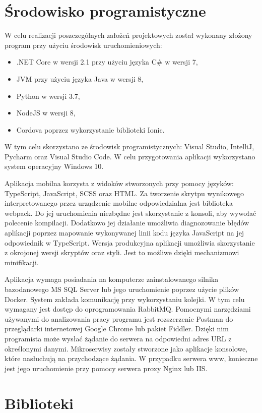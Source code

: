 \section{Środowisko programistyczne}
W celu realizacji poszczególnych założeń projektowych został wykonany złożony program przy użyciu środowisk uruchomieniowych: 
\begin{itemize}[noitemsep]
	\item .NET Core w wersji 2.1 przy użyciu języka C\# w wersji 7,
	\item JVM przy użyciu języka Java w wersji 8,
	\item Python w wersji 3.7,
	\item NodeJS w wersji 8,
	\item Cordova poprzez wykorzystanie biblioteki Ionic.
\end{itemize}
W tym celu skorzystano ze środowisk programistycznych: Visual Studio, IntelliJ, Pycharm oraz Visual Studio Code. W celu przygotowania aplikacji wykorzystano system operacyjny Windows 10.

Aplikacja mobilna korzysta z widoków stworzonych przy pomocy języków: TypeScript, JavaScript, SCSS oraz HTML. Za tworzenie skrytpu wynikowego interpretowanego przez urządzenie mobilne odpowiedzialna jest biblioteka webpack. Do jej uruchomienia niezbędne jest skorzystanie z konsoli, aby wywołać polecenie kompilacji. Dodatkowo jej działanie umożliwia diagnozowanie błędów aplikacji poprzez mapowanie wykonywanej linii kodu języka JavaScript na jej odpowiednik w TypeScript. Wersja produkcyjna aplikacji umożliwia skorzystanie z okrojonej wersji skryptów oraz styli. Jest to możliwe dzięki mechanizmowi minifikacji.

Aplikacja wymaga posiadania na komputerze zainstalowanego silnika bazodanowego MS SQL Server lub jego uruchomienie poprzez użycie plików Docker. System zakłada komunikację przy wykorzystaniu kolejki. W tym celu wymagany jest dostęp do oprogramowania RabbitMQ. Pomocnymi narzędziami używanymi do analizowania pracy programu jest rozszerzenie Postman\cite{Postman} do przeglądarki internetowej Google Chrome lub pakiet Fiddler\cite{Fiddler}. Dzięki nim programista może wysłać żądanie do serwera na odpowiedni adres URL z określonymi danymi. Mikroserwisy zostały stworzone jako aplikacje konsolowe, które nasłuchują na przychodzące żądania. W przypadku serwera www, konieczne jest jego uruchomienie przy pomocy serwera proxy Nginx lub IIS.


\section{Biblioteki}

